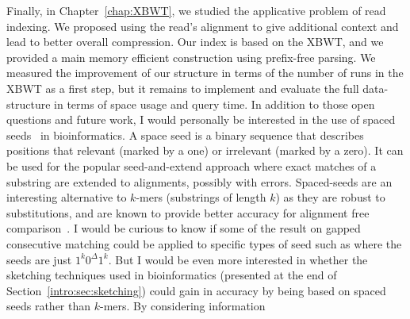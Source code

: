 Finally, in Chapter~\ref{chap:XBWT}, we studied the applicative problem of read indexing. We proposed using the read's alignment to give additional context and lead to better overall compression. Our index is based on the XBWT, and we provided a main memory efficient construction using prefix-free parsing. We measured the improvement of our structure in terms of the number of runs in the XBWT as a first step, but it remains to implement and evaluate the full data-structure in terms of space usage and query time.
%
In addition to those open questions and future work, I would personally be interested in the use of spaced seeds~\cite{li2004patternhunter} in bioinformatics. A space seed is a binary sequence that describes positions that relevant (marked by a one) or irrelevant (marked by a zero). It can be used for the popular seed-and-extend approach where exact matches of a substring are extended to alignments, possibly with errors.
Spaced-seeds are an interesting alternative to $k$-mers (substrings of length $k$) as they are robust to substitutions, and are known to provide better accuracy for alignment free comparison~\cite{}.
I would be curious to know if some of the result on gapped consecutive matching could be applied to specific types of seed such as \cite{} where the seeds are just $1^k 0^\Delta 1^k$.
But I would be even more interested in whether the sketching techniques used in bioinformatics (presented at the end of Section~\ref{intro:sec:sketching}) could gain in accuracy by being based on spaced seeds rather than $k$-mers. By considering information
\backmatter